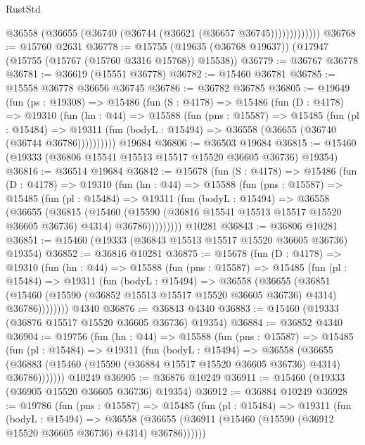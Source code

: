 \begin{lexlean}{RustStd}
\begin{coremodule}
                  @36558 (@36655 (@36740 (@36744 (@36621 (@36657 @36745)))))))))))))
@36768 := @15760 @2631
@36778 := @15755 (@19635 (@36768 @19637)) (@17947 (@15755 (@15767 (@15760 @3316 @15768)) @15538))
@36779 := @36767 @36778
@36781 := @36619 (@15551 @36778)
@36782 := @15460 @36781
@36785 := @15558 @36778 @36656 @36745
@36786 := @36782 @36785
@36805 := @19649
    (fun (ps : @19308) =>
    @15486
      (fun (S : @4178) =>
      @15486
        (fun (D : @4178) =>
        @19310
          (fun (hn : @44) =>
          @15588
            (fun (pns : @15587) =>
            @15485
              (fun (pl : @15484) =>
              @19311 (fun (bodyL : @15494) => @36558 (@36655 (@36740 (@36744 @36786))))))))))
    @19684
@36806 := @36503 @19684
@36815 := @15460 (@19333 (@36806 @15541 @15513 @15517 @15520 @36605 @36736) @19354)
@36816 := @36514 @19684
@36842 := @15678
    (fun (S : @4178) =>
    @15486
      (fun (D : @4178) =>
      @19310
        (fun (hn : @44) =>
        @15588
          (fun (pns : @15587) =>
          @15485
            (fun (pl : @15484) =>
            @19311
              (fun (bodyL : @15494) =>
              @36558
                (@36655
                  (@36815
                    (@15460
                      (@15590 (@36816 @15541 @15513 @15517 @15520 @36605 @36736) @4314)
                      @36786)))))))))
    @10281
@36843 := @36806 @10281
@36851 := @15460 (@19333 (@36843 @15513 @15517 @15520 @36605 @36736) @19354)
@36852 := @36816 @10281
@36875 := @15678
    (fun (D : @4178) =>
    @19310
      (fun (hn : @44) =>
      @15588
        (fun (pns : @15587) =>
        @15485
          (fun (pl : @15484) =>
          @19311
            (fun (bodyL : @15494) =>
            @36558
              (@36655
                (@36851
                  (@15460 (@15590 (@36852 @15513 @15517 @15520 @36605 @36736) @4314) @36786))))))))
    @4340
@36876 := @36843 @4340
@36883 := @15460 (@19333 (@36876 @15517 @15520 @36605 @36736) @19354)
@36884 := @36852 @4340
@36904 := @19756
    (fun (hn : @44) =>
    @15588
      (fun (pns : @15587) =>
      @15485
        (fun (pl : @15484) =>
        @19311
          (fun (bodyL : @15494) =>
          @36558
            (@36655
              (@36883 (@15460 (@15590 (@36884 @15517 @15520 @36605 @36736) @4314) @36786)))))))
    @10249
@36905 := @36876 @10249
@36911 := @15460 (@19333 (@36905 @15520 @36605 @36736) @19354)
@36912 := @36884 @10249
@36928 := @19786
    (fun (pns : @15587) =>
    @15485
      (fun (pl : @15484) =>
      @19311
        (fun (bodyL : @15494) =>
        @36558 (@36655 (@36911 (@15460 (@15590 (@36912 @15520 @36605 @36736) @4314) @36786))))))

\end{coremodule}
\end{lexlean}
